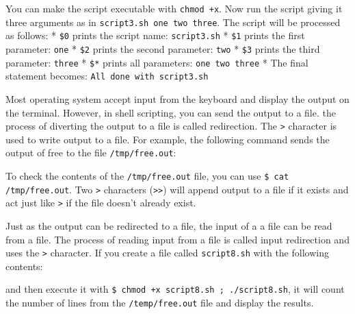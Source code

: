 You can make the script executable with \texttt{chmod +x}. Now run the
script giving it three arguments as in
\texttt{script3.sh one two three}. The script will be processed as
follows: * \texttt{\$0} prints the script name: \texttt{script3.sh} *
\texttt{\$1} prints the first parameter: \texttt{one} * \texttt{\$2}
prints the second parameter: \texttt{two} * \texttt{\$3} prints the
third parameter: \texttt{three} * \texttt{\$*} prints all parameters:
\texttt{one two three} * The final statement becomes:
\texttt{All done with script3.sh}

Most operating system accept input from the keyboard and display the
output on the terminal. However, in shell scripting, you can send the
output to a file. the process of diverting the output to a file is
called redirection. The \texttt{\textgreater{}} character is used to
write output to a file. For example, the following command sends the
output of free to the file \texttt{/tmp/free.out}:

\begin{Shaded}
\begin{Highlighting}[]
\NormalTok{$ } \KeywordTok{>} 
\end{Highlighting}
\end{Shaded}

To check the contents of the \texttt{/tmp/free.out} file, you can use
\texttt{\$ cat /tmp/free.out}. Two \texttt{\textgreater{}} characters
(\texttt{\textgreater{}\textgreater{}}) will append output to a file if
it exists and act just like \texttt{\textgreater{}} if the file doesn't
already exist.

Just as the output can be redirected to a file, the input of a a file
can be read from a file. The process of reading input from a file is
called input redirection and uses the \texttt{\textgreater{}} character.
If you create a file called \texttt{script8.sh} with the following
contents:

\begin{Shaded}
\begin{Highlighting}[]
 
 \KeywordTok{<} 
\end{Highlighting}
\end{Shaded}

and then execute it with \texttt{\$ chmod +x script8.sh ; ./script8.sh},
it will count the number of lines from the \texttt{/temp/free.out} file
and display the results.

